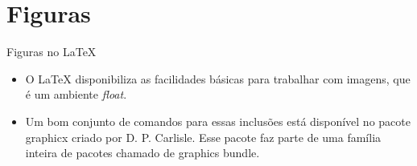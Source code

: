\section{Figuras}

\begin{frame}{Figuras no \LaTeX{}}
\begin{block}{}
\begin{itemize}
 \item O \LaTeX{} disponibiliza as facilidades básicas para trabalhar com imagens, que é um ambiente \textit{float}.
\item Um bom conjunto de comandos para essas inclusões está disponível no pacote graphicx criado por D. P. Carlisle. Esse pacote faz parte de uma família inteira de pacotes chamado de graphics bundle.
\end{itemize}
\end{block}
\end{frame}

\begin{frame}


\end{frame}

\begin{frame}

\end{frame}













